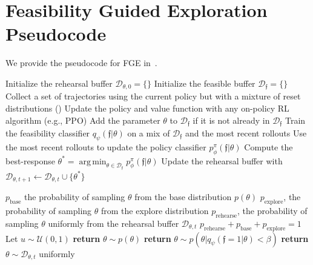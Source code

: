 \documentclass{article} %
\DeclareMathOperator*{\argmin}{arg\,min}
\let\Cref\crtCref
\newcommand{\AlgOursFull}{Feasibility-Guided Exploration}
\newcommand{\AlgOursAbrv}{FGE}
\newcommand{\AlgOurs}{\textcolor{MaterialBlue900}{\small\textsf{\AlgOursAbrv{}}}}
\newcommand{\feas}{\mathfrak{f}}
\newcommand{\MeasuredCISet}{\mathcal{D}_{\feas{}}}
\begin{document}
\section{Feasibility Guided Exploration Pseudocode}\label{app:fge_pseudocode}

We provide the pseudocode for \AlgOurs{} in~\Cref{alg:fge}.

\begin{algorithm}[ht!]
    \caption{\AlgOursFull{} (\AlgOurs{})} \label{alg:fge}
    \begin{algorithmic}[1]
        \State Initialize the rehearsal buffer $\mathcal{D}_{\theta, 0} = \{\}$
        \State Initialize the feasible buffer $\MeasuredCISet = \{\}$
            \State Collect a set of trajectories using the current policy but with a mixture of reset distributions (\Cref{alg:reset_dist})
            \State Update the policy and value function with any on-policy RL algorithm (e.g., PPO)
                    \State Add the parameter $\theta$ to $\MeasuredCISet$ if it is not already in $\MeasuredCISet$
                \EndIf
            \EndFor
            \State Train the feasibility classifier $q_\psi(\feas{} | \theta)$ on a mix of $\MeasuredCISet$ and the most recent rollouts
            \State Use the most recent rollouts to update the policy classifier $p_\phi^\pi(\feas{} | \theta)$
            \State Compute the best-response $\theta^* = \argmin_{\theta \in \MeasuredCISet} p_\phi^\pi(\feas{} | \theta)$ 
            \State Update the rehearsal buffer with $\mathcal{D}_{\theta, {t+1}} \gets \mathcal{D}_{\theta, t} \cup \{ \theta^* \}$
        \EndFor
    \end{algorithmic}
\end{algorithm}

\begin{algorithm}[ht!]
    \caption{Reset Distribution for \AlgOurs{}}\label{alg:reset_dist}
    \begin{algorithmic}[1]
        \Require $p_{\text{base}}$ the probability of sampling $\theta$ from the base distribution $p(\theta)$
        \Require $p_{\text{explore}}$, the probability of sampling $\theta$ from the explore distribution
        \Require $p_{\text{rehearse}}$, the probability of sampling $\theta$ uniformly from the rehearsal buffer $\mathcal{D}_{\theta, t}$
        \Require $p_{\text{rehearse}} + p_{\text{base}} + p_{\text{explore}} = 1$
        \State Let $u \sim \mathcal{U}(0, 1)$
            \State \textbf{return} $\theta \sim p(\theta)$
            \State \textbf{return} $\theta \sim p(\theta | q_\psi(\feas{} = 1 | \theta) < \beta )$
        \Else
            \State \textbf{return} $\theta \sim \mathcal{D}_{\theta, t}$ uniformly
        \EndIf
    \end{algorithmic}
\end{algorithm}
\end{document}
